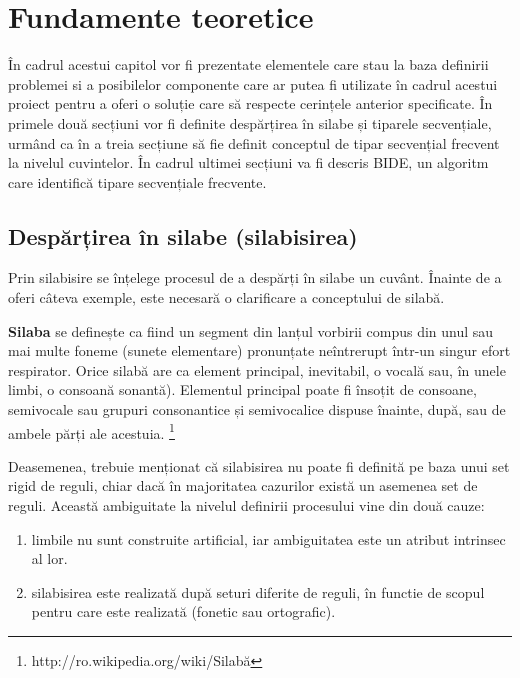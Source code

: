 \chapter{Fundamente teoretice}
\label{cap:fund-teoretice}

În cadrul acestui capitol vor fi prezentate elementele care stau la baza definirii problemei si a posibilelor componente care ar putea fi utilizate în cadrul acestui proiect pentru a oferi o soluție care să respecte cerințele anterior specificate. În primele două secțiuni vor fi definite despărțirea în silabe și tiparele secvențiale, urmând ca în a treia secțiune să fie definit conceptul de tipar secvențial frecvent la nivelul cuvintelor. În cadrul ultimei secțiuni va fi descris BIDE, un algoritm care identifică tipare secvențiale frecvente.

\section{Despărțirea în silabe (silabisirea)}

Prin silabisire se înțelege procesul de a despărți în silabe un cuvânt. Înainte de a oferi câteva exemple, este necesară o clarificare a conceptului de silabă. 

\begin{defi}
\textbf{Silaba} se definește ca fiind un segment din lanțul vorbirii compus din unul sau mai multe foneme (sunete elementare) pronunțate neîntrerupt într-un singur efort respirator. Orice silabă are ca element principal, inevitabil, o vocală sau, în unele limbi, o consoană sonantă). Elementul principal poate fi însoțit de consoane, semivocale sau grupuri consonantice și semivocalice dispuse înainte, după, sau de ambele părți ale acestuia. \footnote{http://ro.wikipedia.org/wiki/Silabă}
\end{defi} 

Deasemenea, trebuie menționat că silabisirea nu poate fi definită pe baza unui set rigid de reguli, chiar dacă în majoritatea cazurilor există un asemenea set de reguli. Această ambiguitate la nivelul definirii procesului vine din două cauze: 
\begin{enumerate}
\item limbile nu sunt construite artificial, iar ambiguitatea este un atribut intrinsec al lor. 
\item silabisirea este realizată după seturi diferite de reguli, în functie de scopul pentru care este realizată (fonetic sau ortografic).  
\end{enumerate}

